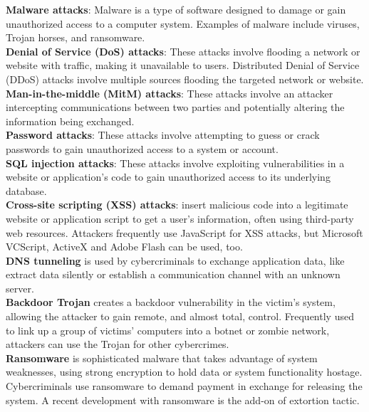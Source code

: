\documentclass[pdflatex,sn-mathphys-num]{sn-jnl}%
\theoremstyle{thmstyleone}%
\theoremstyle{thmstyletwo}%
\theoremstyle{thmstylethree}%
\begin{document}
\noindent  \textbf{Malware attacks}: Malware is a type of software designed to damage or gain unauthorized access to a computer system. Examples of malware include viruses, Trojan horses, and ransomware.\\

\noindent  \textbf{Denial of Service (DoS) attacks}: These attacks involve flooding a network or website with traffic, making it unavailable to users. Distributed Denial of Service (DDoS) attacks involve multiple sources flooding the targeted network or website.\\

\noindent  \textbf{Man-in-the-middle (MitM) attacks}: These attacks involve an attacker intercepting communications between two parties and potentially altering the information being exchanged.\\

\noindent  \textbf{Password attacks}: These attacks involve attempting to guess or crack passwords to gain unauthorized access to a system or account.\\

\noindent  \textbf{SQL injection attacks}: These attacks involve exploiting vulnerabilities in a website or application's code to gain unauthorized access to its underlying database.\\

\noindent \textbf{Cross-site scripting (XSS) attacks}:  insert malicious code into a legitimate website or application script to get a user's information, often using third-party web resources. Attackers frequently use JavaScript for XSS attacks, but Microsoft VCScript, ActiveX and Adobe Flash can be used, too.\\

\noindent  \textbf{DNS tunneling} is used by cybercriminals to exchange application data, like extract data silently or establish a communication channel with an unknown server.\\

\noindent \textbf{Backdoor Trojan} creates a backdoor vulnerability in the victim's system, allowing the attacker to gain remote, and almost total, control. Frequently used to link up a group of victims' computers into a botnet or zombie network, attackers can use the Trojan for other cybercrimes.\\

\noindent \textbf{Ransomware} is sophisticated malware that takes advantage of system weaknesses, using strong encryption to hold data or system functionality hostage. Cybercriminals use ransomware to demand payment in exchange for releasing the system. A recent development with ransomware is the add-on of extortion tactic.\\
\end{document}
